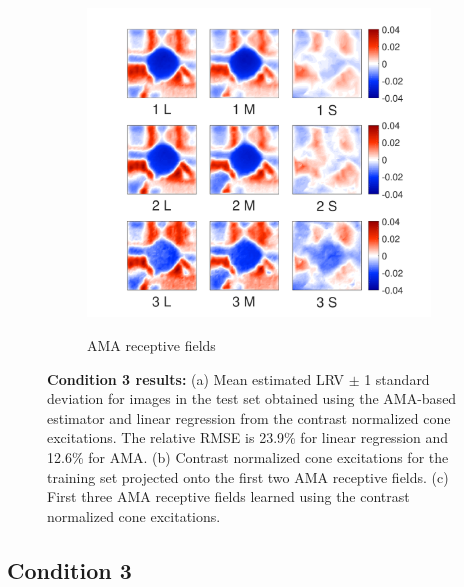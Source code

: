 \documentclass{jov}
\begin{document}
\begin{figure}
\begin{subfigure}[b]{0.31\textwidth}
        \label{fig:case3RFResponse}
    \end{subfigure}
    \begin{subfigure}[b]{0.32 \textwidth}
	\caption{AMA receptive fields}
	\includegraphics[width=1.0\textwidth, trim={0.2cm -0.cm 0 0.3cm}]{../FiguresDraft5/Figure12/Figure12_c.pdf}
	\label{fig:case3RFs}
    \end{subfigure}
    \caption{{\bf Condition 3 results:} (a) Mean estimated LRV $\pm$ 1 standard deviation for images in the test set obtained using the AMA-based estimator and linear regression from the contrast normalized cone excitations. The relative RMSE is 23.9\%  for linear regression and 12.6\% for AMA. (b) Contrast normalized cone excitations for the training set projected onto the first two AMA receptive fields. (c) First three AMA receptive fields learned using the contrast normalized cone excitations.}
\label{fig:Condition3}
\end{figure}

\subsection{Condition 3}
\end{document}
